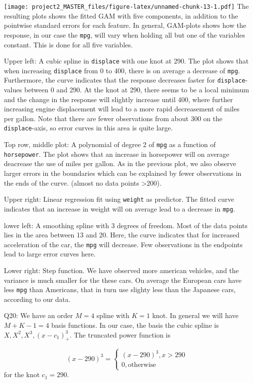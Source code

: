 \documentclass[]{article}
\begin{document}
\texttt{[image: project2\_MASTER\_files/figure-latex/unnamed-chunk-13-1.pdf]}
The resulting plots shows the fitted GAM with five components, in
addition to the pointwise standard errors for each feature. In general,
GAM-plots shows how the response, in our case the \texttt{mpg}, will
vary when holding all but one of the variables constant. This is done
for all five variables.

Upper left: A cubic spline in \texttt{displace} with one knot at 290.
The plot shows that when increasing \texttt{displace} from 0 to 400,
there is on average a decrease of \texttt{mpg}. Furthermore, the curve
indicates that the response decreases faster for
\texttt{displace}-values between 0 and 290. At the knot at 290, there
seems to be a local minimum and the change in the response will slightly
increase until 400, where further increasing engine displacement will
lead to a more rapid decreasement of miles per gallon. Note that there
are fewer observations from about 300 on the \texttt{displace}-axis, so
error curves in this area is quite large.

Top row, middle plot: A polynomial of degree 2 of \texttt{mpg} as a
function of \texttt{horsepower}. The plot shows that an increase in
horsepower will on average deacrease the use of miles per gallon. As in
the previous plot, we also observe larger errors in the boundaries which
can be explained by fewer observations in the ends of the curve. (almost
no data points \textgreater{}200).

Upper right: Linear regression fit using \texttt{weight} as predictor.
The fitted curve indicates that an increase in weight will on average
lead to a decrease in \texttt{mpg}.

lower left: A smoothing spline with 3 degrees of freedom. Most of the
data points lies in the area between 13 and 20. Here, the curve
indicates that for increased acceleration of the car, the \texttt{mpg}
will decrease. Few observations in the endpoints lead to large error
curves here.

Lower right: Step function. We have observed more american vehicles, and
the variance is much smaller for the these cars. On average the European
cars have less \texttt{mpg} than Americans, that in turn use slighty
less than the Japanese cars, according to our data.

Q20: We have an order \(M=4\) spline with \(K=1\) knot. In general we
will have \(M+K-1=4\) basis functions. In our case, the basis the cubic
spline is \(X,X^2,X^3,(x-c_1)_+^3\). The truncated power function is

\[
(x-290)^3= \begin{cases}(x-290)^3, x>290 \\
0, \text{otherwise}
\end{cases}
\] for the knot \(c_1=290\).
\end{document}

